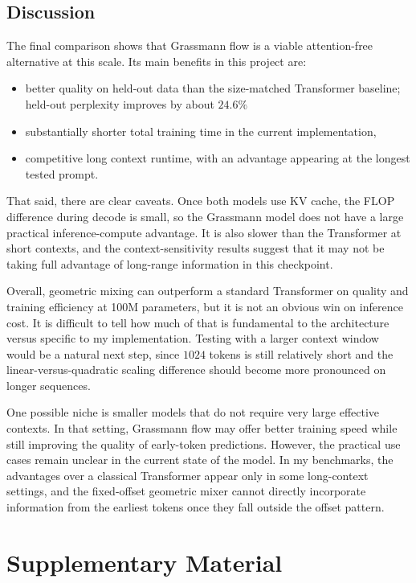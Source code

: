 \documentclass{article}
\begin{document}
\subsection{Discussion}
The final comparison shows that Grassmann flow is a viable attention-free alternative at this scale. Its main benefits in this project are:
\begin{itemize}
    \item better quality on held-out data than the size-matched Transformer baseline; held-out perplexity improves by about \(24.6\%\)
    \item substantially shorter total training time in the current implementation,
    \item competitive long context runtime, with an advantage appearing at the longest tested prompt.
\end{itemize}


That said, there are clear caveats. Once both models use KV cache, the FLOP difference during decode is small, so the Grassmann model does not have a large practical inference-compute advantage. It is also slower than the Transformer at short contexts, and the context-sensitivity results suggest that it may not be taking full advantage of long-range information in this checkpoint.

Overall, geometric mixing can outperform a standard Transformer on quality and training efficiency at 100M parameters, but it is not an obvious win on inference cost. It is difficult to tell how much of that is fundamental to the architecture versus specific to my implementation. Testing with a larger context window would be a natural next step, since \(1024\) tokens is still relatively short and the linear-versus-quadratic scaling difference should become more pronounced on longer sequences.

One possible niche is smaller models that do not require very large effective contexts. In that setting, Grassmann flow may offer better training speed while still improving the quality of early-token predictions. However, the practical use cases remain unclear in the current state of the model. In my benchmarks, the advantages over a classical Transformer appear only in some long-context settings, and the fixed-offset geometric mixer cannot directly incorporate information from the earliest tokens once they fall outside the offset pattern.


\section{Supplementary Material}
\end{document}
